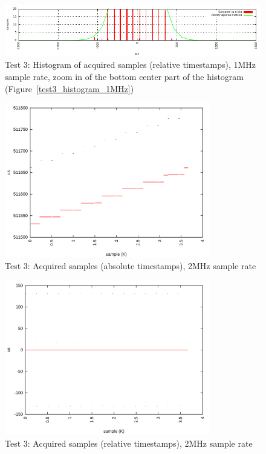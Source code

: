 \documentclass[a4paper, 12pt]{article}
\begin{document}
\begin{figure}[ht!]
  \centering
  \includegraphics[width=1\textwidth]{img/test3_histogram_zoomx_1MHz.pdf}
  \caption{Test 3: Histogram of acquired samples (relative timestamps),
           1MHz sample rate, zoom in of the bottom center part of the histogram
           (Figure~\ref{test3_histogram_1MHz})}
  \label{test3_histogram_zoomx_1MHz}
\end{figure}

\FloatBarrier

\begin{figure}[ht!]
  \centering
  \includegraphics[width=0.80\textwidth]{img/test3_samples_absolute_2MHz.png}
  \caption{Test 3: Acquired samples (absolute timestamps), 2MHz sample rate}
  \label{test3_absolute_2MHz}
\end{figure}

\begin{figure}[ht!]
  \centering
  \includegraphics[width=0.8\textwidth]{img/test3_samples_relative_2MHz.png}
  \caption{Test 3: Acquired samples (relative timestamps), 2MHz sample rate}
  \label{test3_relative_2MHz}
\end{figure}
\end{document}
